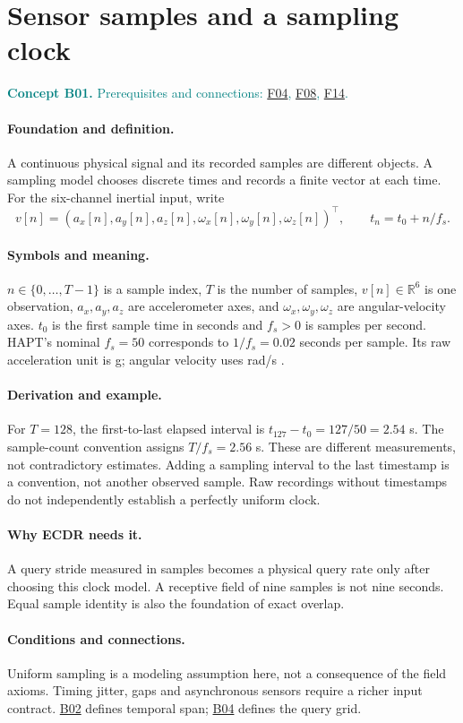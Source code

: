 \documentclass[11pt,a4paper]{article}
\newcommand{\R}{\mathbb R}
\newcommand{\conceptid}{Front matter}
\newcommand{\concept}[3]{\clearpage\renewcommand{\conceptid}{#1}%
\section{#2}\label{concept:#1}%
\textcolor{teal}{\textbf{Concept #1.} Prerequisites and connections: #3.}\par
\typeout{ECDR-CONCEPT-START #1 PAGE=\thepage}}
\begin{document}
\concept{B01}{Sensor samples and a sampling clock}{\hyperref[concept:F04]{F04}, \hyperref[concept:F08]{F08}, \hyperref[concept:F14]{F14}}
\paragraph{Foundation and definition.}
A continuous physical signal and its recorded samples are different objects.
A sampling model chooses discrete times and records a finite vector at each
time. For the six-channel inertial input, write
\[
 v[n]=(a_x[n],a_y[n],a_z[n],\omega_x[n],\omega_y[n],\omega_z[n])^\top,
 \qquad t_n=t_0+n/f_s.
\]
\paragraph{Symbols and meaning.}
$n\in\{0,\ldots,T-1\}$ is a sample index, $T$ is the number of samples,
$v[n]\in\R^6$ is one observation, $a_x,a_y,a_z$ are accelerometer axes,
and $\omega_x,\omega_y,\omega_z$ are angular-velocity axes. $t_0$ is the
first sample time in seconds and $f_s>0$ is samples per second. HAPT's
nominal $f_s=50$ corresponds to $1/f_s=0.02$ seconds per sample. Its raw
acceleration unit is g; angular velocity uses rad/s \cite{hapt}.
\paragraph{Derivation and example.}
For $T=128$, the first-to-last elapsed interval is
$t_{127}-t_0=127/50=2.54$ s. The sample-count convention assigns
$T/f_s=2.56$ s. These are different measurements, not contradictory
estimates. Adding a sampling interval to the last timestamp is a convention,
not another observed sample. Raw recordings without timestamps do not
independently establish a perfectly uniform clock.
\paragraph{Why ECDR needs it.}
A query stride measured in samples becomes a physical query rate only after
choosing this clock model. A receptive field of nine samples is not nine
seconds. Equal sample identity is also the foundation of exact overlap.
\paragraph{Conditions and connections.}
Uniform sampling is a modeling assumption here, not a consequence of the
field axioms. Timing jitter, gaps and asynchronous sensors require a richer
input contract. \hyperref[concept:B02]{B02} defines temporal span; \hyperref[concept:B04]{B04} defines the query grid.
\par\label{endconcept:B01}
\end{document}
